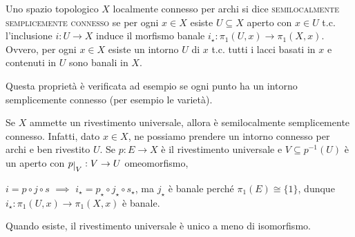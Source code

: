 \begin{defn}
  Uno spazio topologico $X$ localmente connesso per archi si dice \textsc{semilocalmente semplicemente connesso} se per ogni $x \in X$ esiste $U \subseteq X$ aperto con $x \in U$ t.c. l'inclusione $i:U \rightarrow X$ induce il morfismo banale $i_{\star}:\pi_1(U, x) \rightarrow \pi_1(X, x)$. Ovvero, per ogni $x \in X$ esiste un intorno $U$ di $x$ t.c. tutti i lacci basati in $x$ e contenuti in $U$ sono banali in $X$.
\end{defn}

Questa proprietà è verificata ad esempio se ogni punto ha un intorno semplicemente connesso (per esempio le varietà).

\begin{oss}
  Se $X$ ammette un rivestimento universale, allora è semilocalmente semplicemente connesso. Infatti, dato $x \in X$, ne possiamo prendere un intorno connesso per archi e ben rivestito $U$. Se $p:E \rightarrow X$ è il rivestimento universale e $V \subseteq p^{-1}(U)$ è un aperto con $p\restrict{V}:V \rightarrow U$ omeomorfismo,
  \begin{center}
  \end{center}
  $i=p \circ j \circ s$ $\implies$ $i_{\star}=p_{\star} \circ j_{\star} \circ s_{\star}$, ma $j_{\star}$ è banale perché $\pi_1(E) \cong \{1\}$, dunque $i_{\star}:\pi_1(U, x) \rightarrow \pi_1(X, x)$ è banale.
\end{oss}

\begin{lm}
  Quando esiste, il rivestimento universale è unico a meno di isomorfismo.
\end{lm}
